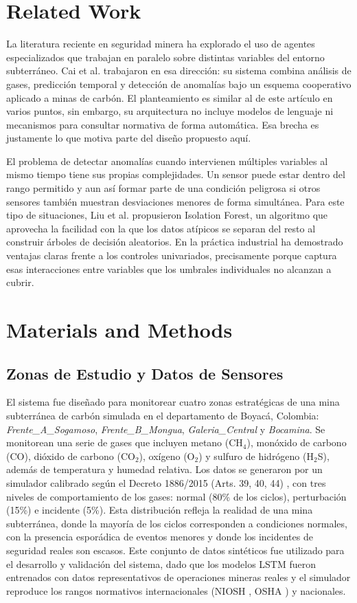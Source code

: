 \documentclass[journal,onecolumn]{IEEEtran}
\begin{document}
\section{Related Work}
\label{sec:related_work}
La literatura reciente en seguridad minera ha explorado el uso de agentes especializados que trabajan en paralelo sobre distintas variables del entorno subterráneo. Cai et al. \cite{cai2021} trabajaron en esa dirección: su sistema combina análisis de gases, predicción temporal y detección de anomalías bajo un esquema cooperativo aplicado a minas de carbón. El planteamiento es similar al de este artículo en varios puntos, sin embargo, su arquitectura no incluye modelos de lenguaje ni mecanismos para consultar normativa de forma automática. Esa brecha es justamente lo que motiva parte del diseño propuesto aquí.

El problema de detectar anomalías cuando intervienen múltiples variables al mismo tiempo tiene sus propias complejidades. Un sensor puede estar dentro del rango permitido y aun así formar parte de una condición peligrosa si otros sensores también muestran desviaciones menores de forma simultánea. Para este tipo de situaciones, Liu et al. \cite{liu2008} propusieron Isolation Forest, un algoritmo que aprovecha la facilidad con la que los datos atípicos se separan del resto al construir árboles de decisión aleatorios. En la práctica industrial ha demostrado ventajas claras frente a los controles univariados, precisamente porque captura esas interacciones entre variables que los umbrales individuales no alcanzan a cubrir.

\section{Materials and Methods}
\label{sec:materials}
\subsection{Zonas de Estudio y Datos de Sensores}
El sistema fue diseñado para monitorear cuatro zonas estratégicas de una mina subterránea de carbón simulada en el departamento de Boyacá, Colombia: \textit{Frente\_A\_Sogamoso}, \textit{Frente\_B\_Mongua}, \textit{Galeria\_Central} y \textit{Bocamina}. Se monitorean una serie de gases que incluyen metano (CH$_4$), monóxido de carbono (CO), dióxido de carbono (CO$_2$), oxígeno (O$_2$) y sulfuro de hidrógeno (H$_2$S), además de temperatura y humedad relativa. Los datos se generaron por un simulador calibrado según el Decreto 1886/2015 (Arts. 39, 40, 44) \cite{decreto1886}, con tres niveles de comportamiento de los gases: normal (80\% de los ciclos), perturbación (15\%) e incidente (5\%). Esta distribución refleja la realidad de una mina subterránea, donde la mayoría de los ciclos corresponden a condiciones normales, con la presencia esporádica de eventos menores y donde los incidentes de seguridad reales son escasos. Este conjunto de datos sintéticos fue utilizado para el desarrollo y validación del sistema, dado que los modelos LSTM fueron entrenados con datos representativos de operaciones mineras reales y el simulador reproduce los rangos normativos internacionales (NIOSH \cite{nioshidlh}, OSHA \cite{osha146}) y nacionales.
\end{document}
